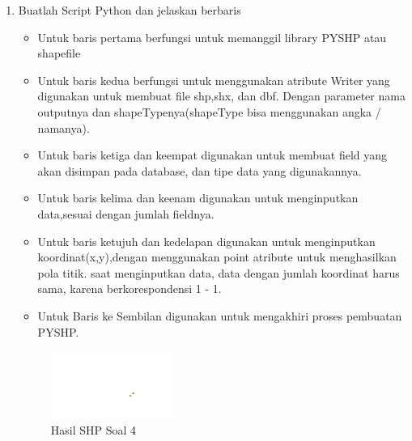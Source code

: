 \begin{enumerate}
	\item Buatlah Script Python dan jelaskan berbaris
	
	\begin{itemize}
		\item Untuk baris pertama berfungsi untuk memanggil library PYSHP atau shapefile
		\item Untuk baris kedua berfungsi untuk menggunakan atribute Writer yang digunakan untuk membuat file shp,shx, dan dbf. \hfill\break Dengan parameter nama outputnya dan shapeTypenya(shapeType bisa menggunakan angka / namanya).
		\item Untuk baris ketiga dan keempat digunakan untuk membuat field yang akan disimpan pada database, dan tipe data yang digunakannya.
		\item Untuk baris kelima dan keenam digunakan untuk menginputkan data,sesuai dengan jumlah fieldnya.
		\item Untuk baris ketujuh dan kedelapan digunakan untuk menginputkan koordinat(x,y),dengan menggunakan point atribute untuk menghasilkan pola titik. \hfill\break
		saat menginputkan data, data dengan jumlah koordinat harus sama, karena berkorespondensi 1 - 1.
		\item Untuk Baris ke Sembilan digunakan untuk mengakhiri proses pembuatan PYSHP.
	\end{itemize}
	\hfill\break
	\begin{figure}[H]
		\includegraphics[width=4cm]{figures/1174095/2/4.png}
		\centering
		\caption{Hasil SHP Soal 4}
	\end{figure}


\end{enumerate}
